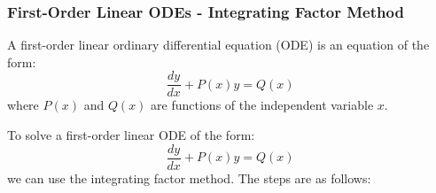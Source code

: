\documentclass[11pt]{article}
\begin{document}
\subsubsection{First-Order Linear ODEs - Integrating Factor Method}
\begin{definition}
    A first-order linear ordinary differential equation (ODE) is an equation of the form:
    \begin{equation}
        \frac{dy}{dx} + P(x)y = Q(x)
    \end{equation}
    where \( P(x) \) and \( Q(x) \) are functions of the independent variable \( x \).
\end{definition}


\begin{definition}
    To solve a first-order linear ODE of the form:
    $$
        \frac{dy}{dx} + P(x)y = Q(x)
    $$
    we can use the integrating factor method. The steps are as follows:
    \begin{enumerate}
        \begin{subequations}
    

\end{subequations}
\end{enumerate}
\end{definition}
\end{document}
